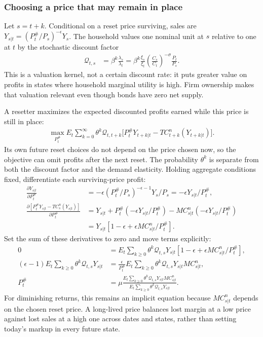 \subsubsection{Choosing a price that may remain in place}

Let $s=t+k$. Conditional on a reset price surviving, sales are
$Y_{s|t}=(P_t^{\#}/P_s)^{-\epsilon}Y_s$. The household values one nominal unit
at $s$ relative to one at $t$ by the stochastic discount factor
\begin{align}
 \mathcal Q_{t,s}
 &=\beta^k\frac{\lambda_s}{\lambda_t}
 =\beta^k\frac{\xi_s}{\xi_t}
       \left(\frac{C_s}{C_t}\right)^{-\sigma}\frac{P_t}{P_s}.
\end{align}
This is a valuation kernel, not a certain discount rate: it puts greater value
on profits in states where household marginal utility is high. Firm ownership
makes that valuation relevant even though bonds have zero net supply.

A resetter maximizes the expected discounted profits earned while this price
is still in place:
\begin{align}
 \max_{P_t^{\#}}E_t\sum_{k=0}^{\infty}\theta^k\mathcal Q_{t,t+k}
 \big[P_t^{\#}Y_{t+k|t}-TC_{t+k}^n(Y_{t+k|t})\big].
\end{align}
Its own future reset choices do not depend on the price chosen now, so the
objective can omit profits after the next reset. The probability $\theta^k$
is separate from both the discount factor and the demand elasticity. Holding
aggregate conditions fixed, differentiate each surviving-price profit:
\begin{align}
 \frac{\partial Y_{s|t}}{\partial P_t^{\#}}
 &=-\epsilon(P_t^{\#}/P_s)^{-\epsilon-1}Y_s/P_s
 =-\epsilon Y_{s|t}/P_t^{\#},\\
 \frac{\partial[P_t^{\#}Y_{s|t}-TC_s^n(Y_{s|t})]}{\partial P_t^{\#}}
 &=Y_{s|t}+P_t^{\#}(-\epsilon Y_{s|t}/P_t^{\#})
                     -MC_{s|t}^n(-\epsilon Y_{s|t}/P_t^{\#})\\
 &=Y_{s|t}[1-\epsilon+\epsilon MC_{s|t}^n/P_t^{\#}].
\end{align}
Set the sum of these derivatives to zero and move terms explicitly:
\begin{align}
 0&=E_t\sum_{k\geq0}\theta^k\mathcal Q_{t,s}Y_{s|t}
             [1-\epsilon+\epsilon MC_{s|t}^n/P_t^{\#}],\\
 (\epsilon-1)E_t\sum_{k\geq0}\theta^k\mathcal Q_{t,s}Y_{s|t}
 &=\frac\epsilon{P_t^{\#}}E_t\sum_{k\geq0}
                  \theta^k\mathcal Q_{t,s}Y_{s|t}MC_{s|t}^n,\\
 P_t^{\#}&=\mu\frac{E_t\sum_{k\geq0}\theta^k\mathcal Q_{t,s}Y_{s|t}MC_{s|t}^n}
                        {E_t\sum_{k\geq0}\theta^k\mathcal Q_{t,s}Y_{s|t}}.
 \label{eq:nk-reset-implicit}
\end{align}
For diminishing returns, this remains an implicit equation because
$MC_{s|t}^n$ depends on the chosen reset price. A long-lived price balances
lost margin at a low price against lost sales at a high one across dates and
states, rather than setting today's markup in every future state.

